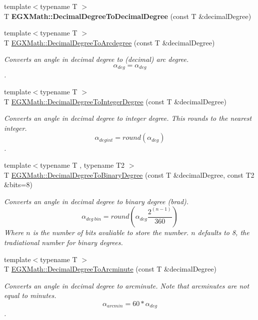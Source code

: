 \begin{DoxyCompactItemize}
{\footnotesize template$<$typename T $>$ }\\T {\bfseries E\+G\+X\+Math\+::\+Decimal\+Degree\+To\+Decimal\+Degree} (const T \&decimal\+Degree)
\item 
{\footnotesize template$<$typename T $>$ }\\T \mbox{\hyperlink{group___e_g_x_math-_conversions-_angle_conversions-_decimal_degree_gacdd463fcabffeb598ebda65b012ce743}{E\+G\+X\+Math\+::\+Decimal\+Degree\+To\+Arcdegree}} (const T \&decimal\+Degree)
\begin{DoxyCompactList}\small\item\em Converts an angle in decimal degree to (decimal) arc degree. \[\alpha_{deg}=\alpha_{deg}\]. \end{DoxyCompactList}\item 
{\footnotesize template$<$typename T $>$ }\\T \mbox{\hyperlink{group___e_g_x_math-_conversions-_angle_conversions-_decimal_degree_ga115239ea7202dbc6a6c9fba68e0ac189}{E\+G\+X\+Math\+::\+Decimal\+Degree\+To\+Integer\+Degree}} (const T \&decimal\+Degree)
\begin{DoxyCompactList}\small\item\em Converts an angle in decimal degree to integer degree. This rounds to the nearest integer. \[\alpha_{deg int}=round(\alpha_{deg})\]. \end{DoxyCompactList}\item 
{\footnotesize template$<$typename T , typename T2 $>$ }\\T \mbox{\hyperlink{group___e_g_x_math-_conversions-_angle_conversions-_decimal_degree_gaceec7ae7988c7f342d0b0fa6940720a1}{E\+G\+X\+Math\+::\+Decimal\+Degree\+To\+Binary\+Degree}} (const T \&decimal\+Degree, const T2 \&bits=8)
\begin{DoxyCompactList}\small\item\em Converts an angle in decimal degree to binary degree (brad). \[\alpha_{deg\ bin}=round(\alpha_{deg}\frac{2^{(n-1)}}{360})\] Where $n$ is the number of bits avaliable to store the number. $n$ defaults to 8, the tradiational number for binary degrees. \end{DoxyCompactList}\item 
{\footnotesize template$<$typename T $>$ }\\T \mbox{\hyperlink{group___e_g_x_math-_conversions-_angle_conversions-_decimal_degree_ga6b6ea6e45d2a13f556824ca419cc9fbd}{E\+G\+X\+Math\+::\+Decimal\+Degree\+To\+Arcminute}} (const T \&decimal\+Degree)
\begin{DoxyCompactList}\small\item\em Converts an angle in decimal degree to arcminute. Note that arcminutes are not equal to minutes. \[\alpha_{arcmin}= 60 * \alpha_{deg}\]. \end{DoxyCompactList}\item 

\end{DoxyCompactItemize}
